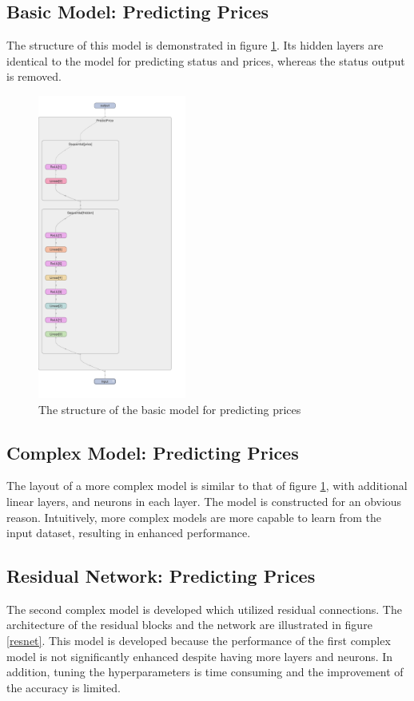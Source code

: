 \documentclass[12pt,twoside]{report}
\begin{document}
\subsection{Basic Model: Predicting Prices}
The structure of this model is demonstrated in figure \ref{basic_model_price}. Its hidden layers are identical to the model for predicting status and prices, whereas the status output is removed.

\begin{figure}[!htbp]
	\centering
	\includegraphics[height=10cm]{basic_model_price}
	\caption{The structure of the basic model for predicting prices}
	\label{basic_model_price}
\end{figure}

\subsection{Complex Model: Predicting Prices}
The layout of a more complex model is similar to that of figure \ref{basic_model_price}, with additional linear layers, and neurons in each layer. The model is constructed for an obvious reason. Intuitively, more complex models are more capable to learn from the input dataset, resulting in enhanced performance. 

\subsection{Residual Network: Predicting Prices}
The second complex model is developed which utilized residual connections. The architecture of the residual blocks and the network are illustrated in figure \ref{resnet}. This model is developed because the performance of the first complex model is not significantly enhanced despite having more layers and neurons. In addition, tuning the hyperparameters is time consuming and the improvement of the accuracy is limited. 
\end{document}
